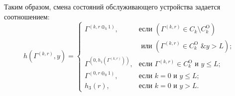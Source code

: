 \documentclass[11pt]{ubs}
\begin{document}
Таким образом, смена состояний обслуживающего устройства задается соотношением:
\begin{equation}
h(\Gamma^{(k,r)},y) = 
\begin{cases}
\Gamma^{(k,r \oplus_k 1)},&  \text{если } (\Gamma^{(k,r)}\in C_k\setminus C_k^{\mathrm{O}}) \\ 
&\text{ или } (\Gamma^{(k,r)}\in C_k^{\mathrm{O}} \text{ \& } y>L);\\
\Gamma^{(0,h_1(\Gamma^{(k,r)}))},&  \text{если } \Gamma^{(k,r)}\in C_k^{\mathrm{O}} \text{ и } y\leqslant L;\\
\Gamma^{(0,r \oplus_0 1)},&  \text{если } k=0 \text{ и } y\leqslant L;\\
h_3(r),&  \text{если } k=0 \text{ и } y > L.
\end{cases}
\label{hLaw}
\end{equation}


















\end{document}
